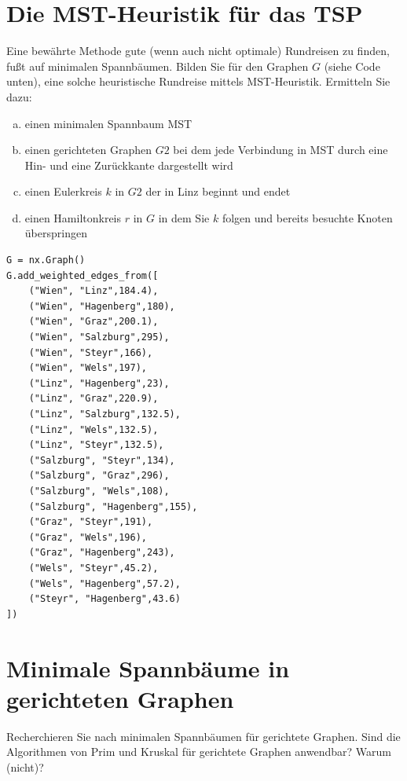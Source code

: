 \documentclass[a4paper,11pt]{report}
\begin{document}
    \newpage

    \chapter{Die MST-Heuristik für das TSP}
    \label{ch:mstHeuristicTSP}
    Eine bewährte Methode gute (wenn auch nicht optimale) Rundreisen zu finden, fußt auf minimalen Spannbäumen.
    Bilden Sie für den Graphen $G$ (siehe Code unten), eine solche heuristische Rundreise mittels MST-Heuristik.
    Ermitteln Sie dazu:

    \begin{enumerate}[a)]
        \item einen minimalen Spannbaum MST
        \item einen gerichteten Graphen $G2$ bei dem jede Verbindung in MST durch eine Hin- und
        eine Zurückkante dargestellt wird
        \item einen Eulerkreis $k$ in $G2$ der in Linz beginnt und endet
        \item einen Hamiltonkreis $r$ in $G$ in dem Sie $k$ folgen und bereits besuchte Knoten
        überspringen
    \end{enumerate}

    \begin{verbatim}
G = nx.Graph()
G.add_weighted_edges_from([
    ("Wien", "Linz",184.4),
    ("Wien", "Hagenberg",180),
    ("Wien", "Graz",200.1),
    ("Wien", "Salzburg",295),
    ("Wien", "Steyr",166),
    ("Wien", "Wels",197),
    ("Linz", "Hagenberg",23),
    ("Linz", "Graz",220.9),
    ("Linz", "Salzburg",132.5),
    ("Linz", "Wels",132.5),
    ("Linz", "Steyr",132.5),
    ("Salzburg", "Steyr",134),
    ("Salzburg", "Graz",296),
    ("Salzburg", "Wels",108),
    ("Salzburg", "Hagenberg",155),
    ("Graz", "Steyr",191),
    ("Graz", "Wels",196),
    ("Graz", "Hagenberg",243),
    ("Wels", "Steyr",45.2),
    ("Wels", "Hagenberg",57.2),
    ("Steyr", "Hagenberg",43.6)
])
    \end{verbatim}

    \newpage

    \chapter{Minimale Spannbäume in gerichteten Graphen}
    \label{ch:minSbDiGraph}
    Recherchieren Sie nach minimalen Spannbäumen für gerichtete Graphen.
    Sind die Algorithmen von Prim und Kruskal für gerichtete Graphen anwendbar?
    Warum (nicht)?
\end{document}
